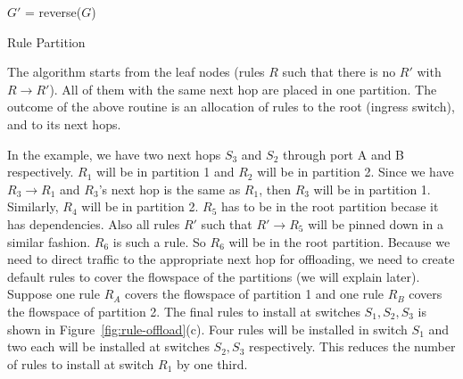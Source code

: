 \begin{algorithm}
  $G'$ = reverse($G$)\; 
 \caption{Rule Partition}
 \label{alg:partition}
\end{algorithm}

The algorithm starts from the leaf nodes (rules $R$ such that there is no $R'$ with
$R \rightarrow R'$). All of them with the same next hop are placed in one
partition. 
The outcome of the above routine is an allocation of rules to the root
(ingress switch), and to its next hops.

In the example, we have two next hops $S_3$ and $S_2$ through port A
and B respectively. $R_1$ will be in partition 1 and $R_2$ will
be in partition 2. Since we have $R_3 \rightarrow R_1$ and $R_3$'s next hop is
the same as $R_1$, then $R_3$ will be in partition 1. Similarly, $R_4$
will be in partition 2. $R_5$ has to be in the root partition becase it has dependencies. 
Also all rules $R'$ such that $R' \rightarrow R_5$ will be pinned down in
a similar fashion. $R_6$ is such a rule. So $R_6$ will be in the root
partition.
Because we need to direct
traffic to the appropriate next hop for offloading, we need to create default
rules to cover the flowspace of the partitions (we will explain later). 
Suppose one rule $R_A$ covers
the flowspace of partition 1 and one rule $R_B$ covers the flowspace of
partition 2. The final rules to install at switches $S_1,S_2,S_3$ is shown in
Figure~\ref{fig:rule-offload}(c). Four rules will be installed in switch $S_1$
and two each will be installed at switches $S_2,S_3$ respectively. This reduces
the number of rules to install at switch $R_1$ by one third.


